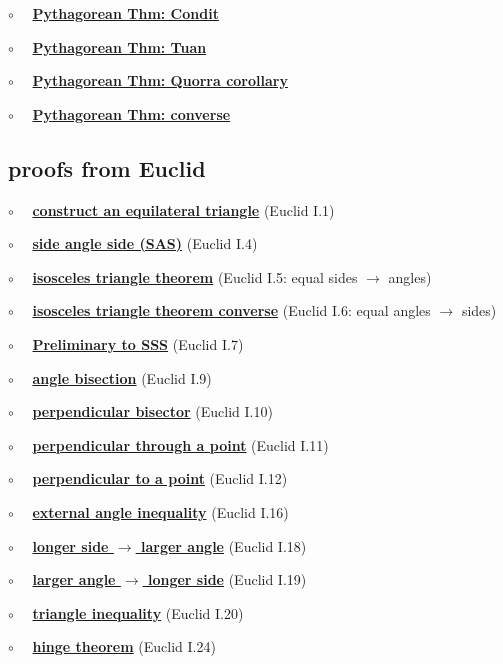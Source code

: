 \documentclass[11pt, oneside]{article}
\begin{document}
$\circ$ \ \ \hyperref[sec:Condit]{\textbf{Pythagorean Thm:  Condit}}

$\circ$ \ \ \hyperref[sec:Pthm_Tuan]{\textbf{Pythagorean Thm:  Tuan}}

$\circ$ \ \ \hyperref[sec:Quorra]{\textbf{Pythagorean Thm:  Quorra corollary}}

$\circ$ \ \ \hyperref[sec:Pythagorean_theorem_converse]{\textbf{Pythagorean Thm:  converse}}


\subsection*{proofs from Euclid}

$\circ$ \ \ \hyperref[sec:Euclid_I_1]{\textbf{construct an equilateral triangle}} (Euclid I.1)

$\circ$ \ \ \hyperref[sec:Euclid_I_4]{\textbf{side angle side (SAS)}} (Euclid I.4)

$\circ$ \ \ \hyperref[sec:Euclid_I_5]{\textbf{isosceles triangle theorem}} (Euclid I.5:  equal sides $\rightarrow$ angles)

$\circ$ \ \ \hyperref[sec:Euclid_I_6]{\textbf{isosceles triangle theorem converse}} (Euclid I.6:  equal angles $\rightarrow$ sides)

$\circ$ \ \ \hyperref[sec:Euclid_I_7]{\textbf{Preliminary to SSS}} (Euclid I.7)

$\circ$ \ \ \hyperref[sec:Euclid_I_9]{\textbf{angle bisection}} (Euclid I.9)

$\circ$ \ \ \hyperref[sec:Euclid_I_10]{\textbf{perpendicular bisector}} (Euclid I.10)

$\circ$ \ \ \hyperref[sec:Euclid_I_11]{\textbf{perpendicular through a point}} (Euclid I.11)

$\circ$ \ \ \hyperref[sec:Euclid_I_12]{\textbf{perpendicular to a point}} (Euclid I.12)

$\circ$ \ \ \hyperref[sec:Euclid_I_16]{\textbf{external angle inequality}} (Euclid I.16)

$\circ$ \ \ \hyperref[sec:Euclid_I_18]{\textbf{longer side $\rightarrow$ larger angle}}  (Euclid I.18)

$\circ$ \ \ \hyperref[sec:Euclid_I_19]{\textbf{larger angle $\rightarrow$ longer side}} (Euclid I.19)

$\circ$ \ \ \hyperref[sec:triangle_inequality]{\textbf{triangle inequality}} (Euclid I.20)

$\circ$ \ \ \hyperref[sec:hinge_theorem]{\textbf{hinge theorem}} (Euclid I.24)
\end{document}

